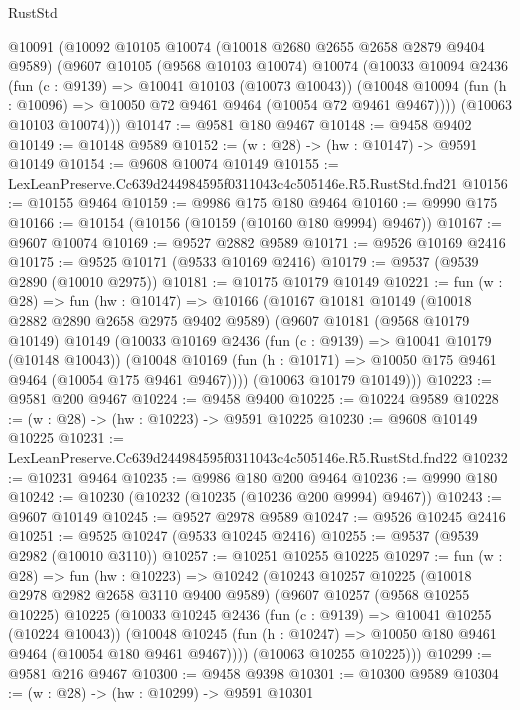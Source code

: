 \begin{lexlean}{RustStd}
\begin{coremodule}
  @10091
    (@10092
      @10105
      @10074
      (@10018 @2680 @2655 @2658 @2879 @9404 @9589)
      (@9607
        @10105
        (@9568 @10103 @10074)
        @10074
        (@10033
          @10094
          @2436
          (fun (c : @9139) => @10041 @10103 (@10073 @10043))
          (@10048 @10094 (fun (h : @10096) => @10050 @72 @9461 @9464 (@10054 @72 @9461 @9467))))
        (@10063 @10103 @10074)))
@10147 := @9581 @180 @9467
@10148 := @9458 @9402
@10149 := @10148 @9589
@10152 := (w : @28) -> (hw : @10147) -> @9591 @10149
@10154 := @9608 @10074 @10149
@10155 := LexLeanPreserve.Cc639d244984595f0311043c4c505146e.R5.RustStd.fnd21
@10156 := @10155 @9464
@10159 := @9986 @175 @180 @9464
@10160 := @9990 @175
@10166 := @10154 (@10156 (@10159 (@10160 @180 @9994) @9467))
@10167 := @9607 @10074
@10169 := @9527 @2882 @9589
@10171 := @9526 @10169 @2416
@10175 := @9525 @10171 (@9533 @10169 @2416)
@10179 := @9537 (@9539 @2890 (@10010 @2975))
@10181 := @10175 @10179 @10149
@10221 := fun (w : @28) =>
  fun (hw : @10147) =>
  @10166
    (@10167
      @10181
      @10149
      (@10018 @2882 @2890 @2658 @2975 @9402 @9589)
      (@9607
        @10181
        (@9568 @10179 @10149)
        @10149
        (@10033
          @10169
          @2436
          (fun (c : @9139) => @10041 @10179 (@10148 @10043))
          (@10048 @10169 (fun (h : @10171) => @10050 @175 @9461 @9464 (@10054 @175 @9461 @9467))))
        (@10063 @10179 @10149)))
@10223 := @9581 @200 @9467
@10224 := @9458 @9400
@10225 := @10224 @9589
@10228 := (w : @28) -> (hw : @10223) -> @9591 @10225
@10230 := @9608 @10149 @10225
@10231 := LexLeanPreserve.Cc639d244984595f0311043c4c505146e.R5.RustStd.fnd22
@10232 := @10231 @9464
@10235 := @9986 @180 @200 @9464
@10236 := @9990 @180
@10242 := @10230 (@10232 (@10235 (@10236 @200 @9994) @9467))
@10243 := @9607 @10149
@10245 := @9527 @2978 @9589
@10247 := @9526 @10245 @2416
@10251 := @9525 @10247 (@9533 @10245 @2416)
@10255 := @9537 (@9539 @2982 (@10010 @3110))
@10257 := @10251 @10255 @10225
@10297 := fun (w : @28) =>
  fun (hw : @10223) =>
  @10242
    (@10243
      @10257
      @10225
      (@10018 @2978 @2982 @2658 @3110 @9400 @9589)
      (@9607
        @10257
        (@9568 @10255 @10225)
        @10225
        (@10033
          @10245
          @2436
          (fun (c : @9139) => @10041 @10255 (@10224 @10043))
          (@10048 @10245 (fun (h : @10247) => @10050 @180 @9461 @9464 (@10054 @180 @9461 @9467))))
        (@10063 @10255 @10225)))
@10299 := @9581 @216 @9467
@10300 := @9458 @9398
@10301 := @10300 @9589
@10304 := (w : @28) -> (hw : @10299) -> @9591 @10301

\end{coremodule}
\end{lexlean}
